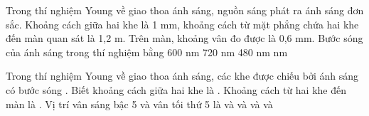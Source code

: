 \begin{vidu}%
 Trong thí nghiệm Young về giao thoa ánh sáng, nguồn sáng phát ra ánh sáng đơn sắc. Khoảng cách giữa hai khe là 1 mm, khoảng cách từ mặt phẳng chứa hai khe đến màn quan sát là 1,2 m. Trên màn, khoảng vân đo được là 0,6 mm. Bước sóng của ánh sáng trong thí nghiệm bằng
\choice
{600 nm}
{720 nm}
{480 nm}
{ nm}
\end{vidu} %
\begin{vidu}%
Trong thí nghiệm Young về giao thoa ánh sáng, các khe  được chiếu bởi ánh sáng có bước sóng . Biết khoảng cách giữa hai khe là . Khoảng cách từ hai khe đến màn là . Vị trí vân sáng bậc 5 và vân tối thứ 5 là
\choice
{ và }
{ và }
{ và }
{\True {} và }
\end{vidu} %

